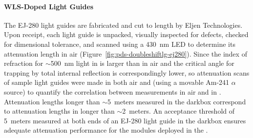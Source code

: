 \paragraph*{WLS-Doped Light Guides}

The EJ-280 light guides are fabricated and cut to length by Eljen Technologies. Upon receipt, each light guide is unpacked, visually inspected for defects, checked for dimensional tolerance, and scanned using a \SI{430}{nm} LED to determine its attenuation length in air (Figure~\ref{fig:pds-doubleshiftlg-ej280}). 
Since the index of refraction for $\sim$\SI{500}{nm} light in \lar is larger than in air and the critical angle for trapping by total internal reflection is correspondingly lower, so attenuation scans of sample light guides were made in both air and \lar (using a movable Am-241 $\alpha$ source) to quantify the correlation between measurements in air and in \lar.  Attenuation lengths longer than $\sim$5~meters measured in the darkbox correspond to attenuation lengths in \lar longer than $\sim$2~meters. An acceptance threshold of 5~meters measured at both ends of an EJ-280 light guide in the darkbox ensures adequate attenuation performance for the modules deployed in the .


